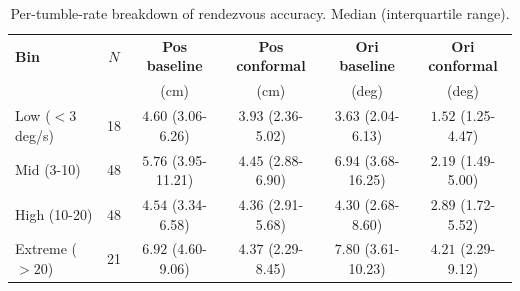\begin{table}[t]
\centering
\caption{Per-tumble-rate breakdown of rendezvous accuracy. Median (interquartile range).}
\label{tab:per_tumble}
\begin{tabular}{lccccc}
\toprule
\textbf{Bin} & $N$ & \textbf{Pos baseline} & \textbf{Pos conformal} & \textbf{Ori baseline} & \textbf{Ori conformal} \\
 & & (cm) & (cm) & (deg) & (deg) \\
\midrule
Low ($<3$\,deg/s) & 18 & $4.60$ (3.06-6.26) & $3.93$ (2.36-5.02) & $3.63$ (2.04-6.13) & $1.52$ (1.25-4.47) \\
Mid (3-10) & 48 & $5.76$ (3.95-11.21) & $4.45$ (2.88-6.90) & $6.94$ (3.68-16.25) & $2.19$ (1.49-5.00) \\
High (10-20) & 48 & $4.54$ (3.34-6.58) & $4.36$ (2.91-5.68) & $4.30$ (2.68-8.60) & $2.89$ (1.72-5.52) \\
Extreme ($>20$) & 21 & $6.92$ (4.60-9.06) & $4.37$ (2.29-8.45) & $7.80$ (3.61-10.23) & $4.21$ (2.29-9.12) \\
\bottomrule
\end{tabular}
\end{table}